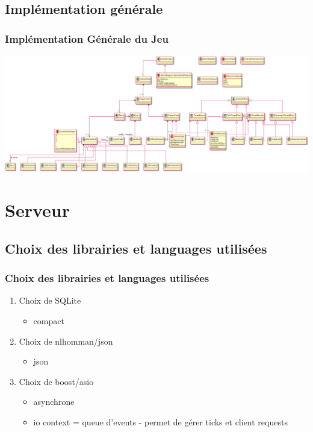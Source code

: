 \documentclass{beamer}
\begin{document}
\subsection{Implémentation générale}
\begin{frame}
\frametitle{Implémentation Générale du Jeu}

\includegraphics[width=1\textwidth]{../../res/uml/class/GameStructureClass.png}
\end{frame}

\section{Serveur}

\subsection{Choix des librairies et languages utilisées}
\begin{frame}
\frametitle{Choix des librairies et languages utilisées}

\begin{enumerate}
	\item Choix de SQLite
		\begin{itemize}
			\item compact
		\end{itemize}
	
	\item Choix de nlhomman/json
		\begin{itemize}
			\item json
		\end{itemize}
		
	\item Choix de boost/asio
		\begin{itemize}
			\item asynchrone
			\item io context = queue d'events - permet de gérer ticks  et client requests
		\end{itemize}
		
\end{enumerate}
\end{frame}
\end{document}
